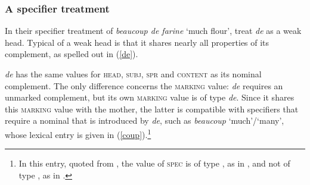 \documentclass[output=paper,biblatex,babelshorthands,newtxmath,draftmode,colorlinks,citecolor=brown]{langscibook}
\begin{document}
\subsubsection{A specifier treatment} 

\largerpage
In their specifier treatment of \emph{beaucoup de farine} `much flour',  
\citet{Abeilleetal04} treat \emph{de} as a weak head. 
Typical of a weak head is that it shares 
nearly all properties of its complement, as spelled out in (\ref{de}).

\begin{exe} 
\ex\label{de} 
\end{exe} 

\noindent
\emph{de} has the same values for \textsc{head}, \textsc{subj}, \textsc{spr} and 
\textsc{content} as its nominal complement. 
The only difference concerns the \textsc{marking} value: \emph{de} requires an 
unmarked complement, but its own \textsc{marking} value is of type \emph{de}. 
Since it shares this \textsc{marking} value with the mother, the latter is 
compatible with specifiers that require a nominal that is introduced by \emph{de}, 
such as \emph{beaucoup} `much'/`many', whose lexical entry is given in 
(\ref{coup}).\footnote{In this entry, quoted from \citet[18]{Abeilleetal04}, 
the value of \textsc{spec} is of type , as in \citet[]{ps2}, and not of type 
, as in \citet[]{GS00}.}  

\begin{exe} 
\ex\label{coup} 
\end{exe} 
\end{document}
